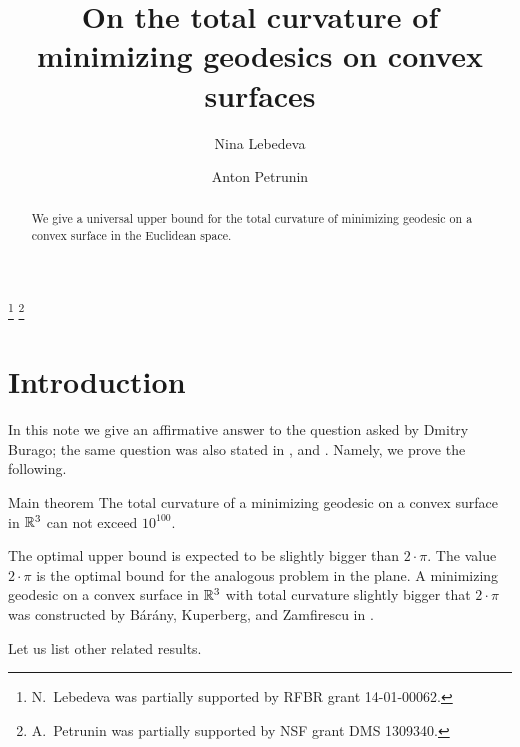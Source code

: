 \documentclass[a4paper,10pt]{amsart}
\begin{document}
\title{On the total curvature of \\
minimizing geodesics on convex surfaces}
\author{Nina Lebedeva}
\address{N. Lebedeva\newline\vskip-4mm
Math. Dept.
St. Petersburg State University,
Universitetsky pr., 28, 
Stary Peterhof, 
198504, Russia.
\newline\vskip-4mm
Steklov Institute,
27 Fontanka, St. Petersburg, 
191023, Russia.}
\author{Anton Petrunin}
\address{A. Petrunin\newline\vskip-4mm
Math. Dept. PSU,
University Park, PA 16802,
USA}
\thanks{N.~Lebedeva was partially supported by RFBR grant 
14-01-00062.}
\thanks{A.~Petrunin was partially supported by NSF grant DMS 1309340.}


\date{}

\begin{abstract}
We give a universal upper bound 
for the total curvature 
of minimizing geodesic 
on a convex surface 
in the Euclidean space.
\end{abstract}
\maketitle

\section{Introduction}

In this note we give an affirmative answer to the question asked by Dmitry Burago; 
the same question was also stated in \cite{AH-PSV}, \cite{pach} and \cite{BKZ}.
Namely, we prove the following.

\begin{thm}{Main theorem}\label{thm:main}
The total curvature of a minimizing geodesic
on a convex surface in $\mathbb{R}^3$ can not exceed $10^{100}$.
\end{thm}

The optimal upper bound is expected to be slightly bigger than $2\cdot\pi$.
The value $2\cdot\pi$ is the optimal bound for the analogous problem in the plane.
A minimizing geodesic on a convex surface in $\mathbb{R}^3$
with total curvature slightly bigger that $2\cdot\pi$ was constructed by 
B{\'a}r{\'a}ny,
Kuperberg, 
and Zamfirescu in \cite{BKZ}.

Let us list other related results.
\end{document}
